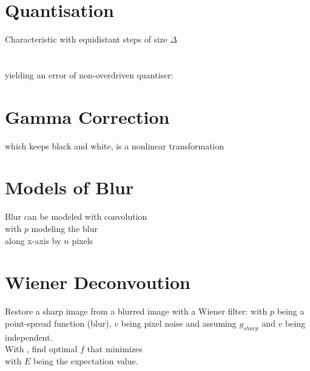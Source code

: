 \documentclass[a4paper,12pt,pdftex]{scrreprt}
\begin{document}
	\section{Quantisation} %
	\label{sec:quantisation}
	Characteristic with equidistant steps of size $\Delta$\\
	\\
	\\
	yielding an error of non-overdriven quantiser:\\
	
	\section{Gamma Correction} %
	\label{sec:gamma_correction}
	 which keeps black and white, is a nonlinear transformation

	\section{Models of Blur} %
	\label{sec:models_of_blur}
	Blur can be modeled with convolution\\
	 with $p$ modeling the blur\\
	 along x-axis by $n$ pixels\\

	\section{Wiener Deconvoution} %
	\label{sec:wiener_deconvoution}
	Restore a sharp image from a blurred image with a Wiener filter:
	 with $p$ being a point-spread function (blur), $v$ being pixel noise and assuming $g_{sharp}$ and $v$ being independent.\\
	With , find optimal $f$ that minimizes\\
	 with $E$ being the expectation value.
\end{document}

